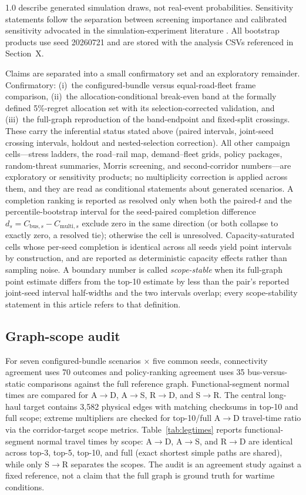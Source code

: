 \documentclass{ieeeaccess}
\begin{document}
1.0 describe generated simulation draws, not real-event probabilities. Sensitivity statements follow the separation between screening importance and calibrated sensitivity advocated in the simulation-experiment literature \cite{b22,b23}. All bootstrap products use seed 20260721 and are stored with the analysis CSVs referenced in Section~X.

Claims are separated into a small confirmatory set and an exploratory remainder. Confirmatory: (i)~the configured-bundle versus equal-road-fleet frame comparison, (ii)~the allocation-conditional break-even band at the formally defined 5\%-regret allocation set with its selection-corrected validation, and (iii)~the full-graph reproduction of the band-endpoint and fixed-split crossings. These carry the inferential status stated above (paired intervals, joint-seed crossing intervals, holdout and nested-selection correction). All other campaign cells---stress ladders, the road--rail map, demand--fleet grids, policy packages, random-threat summaries, Morris screening, and second-corridor numbers---are exploratory or sensitivity products; no multiplicity correction is applied across them, and they are read as conditional statements about generated scenarios. A completion ranking is reported as resolved only when both the paired-$t$ and the percentile-bootstrap interval for the seed-paired completion difference $d_s=C_{\mathrm{bus},s}-C_{\mathrm{multi},s}$ exclude zero in the same direction (or both collapse to exactly zero, a resolved tie); otherwise the cell is unresolved. Capacity-saturated cells whose per-seed completion is identical across all seeds yield point intervals by construction, and are reported as deterministic capacity effects rather than sampling noise. A boundary number is called \emph{scope-stable} when its full-graph point estimate differs from the top-10 estimate by less than the pair's reported joint-seed interval half-widths and the two intervals overlap; every scope-stability statement in this article refers to that definition.

\subsection{Graph-scope audit}
For seven configured-bundle scenarios $\times$ five common seeds, connectivity agreement uses 70 outcomes and policy-ranking agreement uses 35 bus-versus-static comparisons against the full reference graph. Functional-segment normal times are compared for A$\rightarrow$D, A$\rightarrow$S, R$\rightarrow$D, and S$\rightarrow$R. The central long-haul target contains 3{,}582 physical edges with matching checksums in top-10 and full scope; extreme multipliers are checked for top-10/full A$\rightarrow$D travel-time ratio via the corridor-target scope metrics. Table~\ref{tab:legtimes} reports functional-segment normal travel times by scope: A$\rightarrow$D, A$\rightarrow$S, and R$\rightarrow$D are identical across top-3, top-5, top-10, and full (exact shortest simple paths are shared), while only S$\rightarrow$R separates the scopes. The audit is an agreement study against a fixed reference, not a claim that the full graph is ground truth for wartime conditions.
\end{document}

